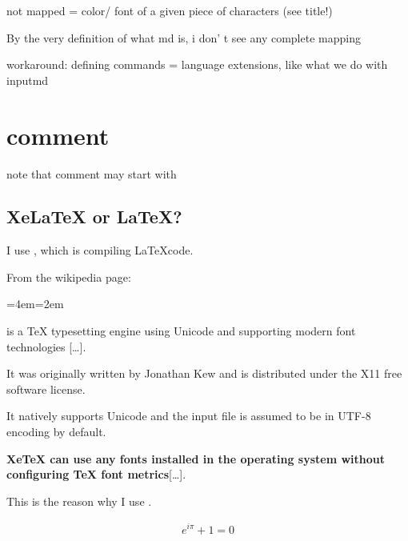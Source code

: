 \documentclass[a4paper, 11pt, titlepage, openany]{article}
\newenvironment{blockquote}{%
  \par%
  \medskip
  \leftskip=4em\rightskip=2em%
  \noindent\ignorespaces}{%
  \par\medskip}
\begin{document}
not mapped = color/ font of a given piece of characters (see title!)

By the very definition of what md is, i don' t see any complete mapping

workaround: defining commands = language extensions, like what we do with inputmd

\section{comment}

note that comment may start with %

\subsection{XeLaTeX or LaTeX?}

I use \XeLaTeX, which is \XeTeX compiling \LaTeX code.

From the \href{https://en.wikipedia.org/wiki/XeTeX}{{{\XeTeX{}}}} wikipedia page:

\begin{blockquote}

{{\XeTeX{}}} is a {{\TeX{}}} typesetting engine using Unicode and supporting modern font technologies […]. 

It was originally written by Jonathan Kew and is distributed under the X11 free software license.

It natively supports Unicode and the input file is assumed to be in UTF-8 encoding by default. 

\textbf{XeTeX can use any fonts installed in the operating system without configuring TeX font metrics}[…].\end{blockquote}

This is the reason why I use \XeLaTeX {{$\uparrow$}}.



\begin{align}  e^{i\pi} + 1 = 0  \end{align}

\end{document}
